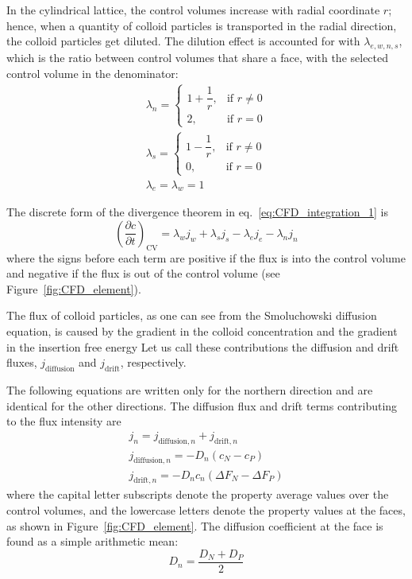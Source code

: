 \documentclass[10pt, a4paper]{article}
\begin{document}
\begin{multicols}{2}
In the cylindrical lattice, the control volumes increase with radial coordinate $r$; hence, when a quantity of colloid particles is transported in the radial direction, the colloid particles get diluted.
The dilution effect is accounted for with $\lambda_{e,w,n,s}$, which is the ratio between control volumes that share a face, with the selected control volume in the denominator:
\begin{eqnarray}
    \lambda_n =\begin{cases}
        1 + \dfrac{1}{r}, & \text{if } r \ne 0\\
        2, & \text{if } r = 0
    \end{cases}
    \\
    \lambda_s =\begin{cases}
        1 - \dfrac{1}{r}, & \text{if } r \ne 0\\
        0, & \text{if } r = 0
    \end{cases}
    \\
    \lambda_{e} = \lambda_{w} = 1
\end{eqnarray}

The discrete form of the divergence theorem in eq.~\ref{eq:CFD_integration_1} is
\begin{equation}
    \label{eq:CFD_integration_2}
    \left( \frac{\partial c}{\partial t} \right)_{\textrm{CV}} = \lambda_w j_w + \lambda_s j_s - \lambda_e j_e - \lambda_n j_n
\end{equation}
where the signs before each term are positive if the flux is into the control volume and negative if the flux is out of the control volume (see Figure~\ref{fig:CFD_element}).

The flux of colloid particles, as one can see from the Smoluchowski diffusion equation, is caused by the gradient in the colloid concentration and the gradient in the insertion free energy
Let us call these contributions the diffusion and drift fluxes, $j_{\textrm{diffusion}}$ and $j_{\textrm{drift}}$, respectively.

The following equations are written only for the northern direction and are identical for the other directions.
The diffusion flux and drift terms contributing to the flux intensity are
\begin{eqnarray}
    j_n = j_{\textrm{diffusion}, n} + j_{\textrm{drift}, n} \\
    j_{\textrm{diffusion}, n} = - D_n (c_N - c_P) \\
    j_{\textrm{drift}, n} = - D_n c_n (\Delta F_N - \Delta F_P)
\end{eqnarray}
where the capital letter subscripts denote the property average values over the control volumes, and the lowercase letters denote the property values at the faces, as shown in Figure~\ref{fig:CFD_element}.
The diffusion coefficient at the face is found as a simple arithmetic mean:
\begin{equation}
    D_n = \frac{D_N + D_P}{2}
\end{equation}


\end{multicols}
\end{document}
